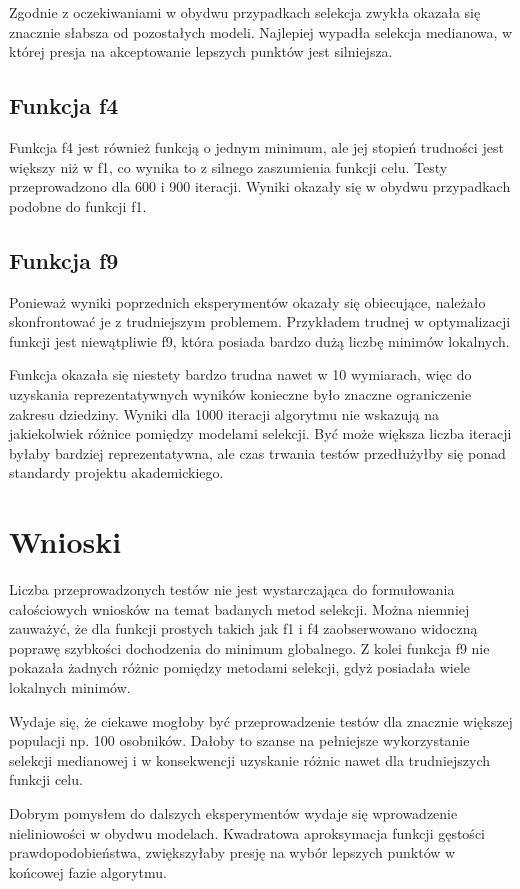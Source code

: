 \documentclass[11pt]{article}
\begin{document}
Zgodnie z oczekiwaniami w obydwu przypadkach selekcja zwykła okazała się znacznie słabsza od pozostałych modeli.
Najlepiej wypadła selekcja medianowa, w której presja na akceptowanie lepszych punktów jest silniejsza.

\subsection{Funkcja f4}
Funkcja f4 jest również funkcją o jednym minimum, ale jej stopień trudności jest większy niż w f1, co wynika to z silnego zaszumienia funkcji celu.
Testy przeprowadzono dla 600 i 900 iteracji.
Wyniki okazały się w obydwu przypadkach podobne do funkcji f1.

\subsection{Funkcja f9}
Ponieważ wyniki poprzednich eksperymentów okazały się obiecujące, należało skonfrontować je z trudniejszym problemem.
Przykładem trudnej w optymalizacji funkcji jest niewątpliwie f9, która posiada bardzo dużą liczbę minimów lokalnych.

Funkcja okazała się niestety bardzo trudna nawet w 10 wymiarach, więc do uzyskania reprezentatywnych wyników konieczne było znaczne ograniczenie zakresu dziedziny.
Wyniki dla 1000 iteracji algorytmu nie wskazują na jakiekolwiek różnice pomiędzy modelami selekcji.
Być może większa liczba iteracji byłaby bardziej reprezentatywna, ale czas trwania testów przedłużyłby się ponad standardy projektu akademickiego.

\section{Wnioski}
Liczba przeprowadzonych testów nie jest wystarczająca do formułowania całościowych wniosków na temat badanych metod selekcji.
Można niemniej zauważyć, że dla funkcji prostych takich jak f1 i f4 zaobserwowano widoczną poprawę szybkości dochodzenia do minimum globalnego.
Z kolei funkcja f9 nie pokazała żadnych różnic pomiędzy metodami selekcji, gdyż posiadała wiele lokalnych minimów.

Wydaje się, że ciekawe mogłoby być przeprowadzenie testów dla znacznie większej populacji np. 100 osobników.
Dałoby to szanse na pełniejsze wykorzystanie selekcji medianowej i w konsekwencji uzyskanie różnic nawet dla trudniejszych funkcji celu.

Dobrym pomysłem do dalszych eksperymentów wydaje się wprowadzenie nieliniowości w obydwu modelach.
Kwadratowa aproksymacja funkcji gęstości prawdopodobieństwa, zwiększyłaby presję na wybór lepszych punktów w końcowej fazie algorytmu.
\end{document}
